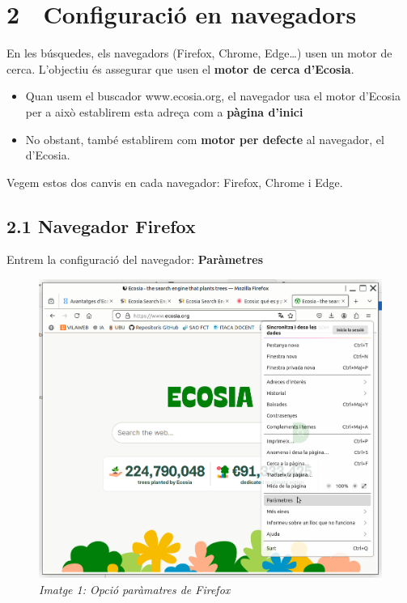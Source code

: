 \documentclass[
  a4paper,
]{article}
\providecommand{\tightlist}{%
  \setlength{\itemsep}{0pt}\setlength{\parskip}{0pt}}
\begin{document}
\newpage

\section{2 🔧 Configuració en
navegadors}\label{configuraciuxf3-en-navegadors}

En les búsquedes, els navegadors (Firefox, Chrome, Edge\ldots) usen un
motor de cerca. L'objectiu és assegurar que usen el \textbf{motor de
cerca d'Ecosia}.

\begin{itemize}
\tightlist
\item
  Quan usem el buscador www.ecosia.org, el navegador usa el motor
  d'Ecosia per a això establirem esta adreça com a \textbf{pàgina
  d'inici}
\item
  No obstant, també establirem com \textbf{motor per defecte} al
  navegador, el d'Ecosia.
\end{itemize}

Vegem estos dos canvis en cada navegador: Firefox, Chrome i Edge.

\subsection{2.1 Navegador Firefox}\label{navegador-firefox}

Entrem la configuració del navegador:
\textbf{\textbar\textbar\textbar{}} \textbf{Paràmetres}

\begin{figure}
\centering
\includegraphics{png/1-Firefox-Parametres.png}
\caption{\emph{Imatge 1: Opció paràmatres de Firefox}}
\end{figure}
\end{document}
